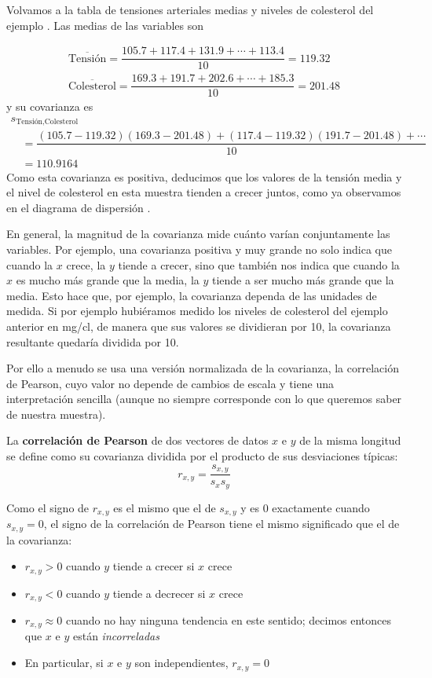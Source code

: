 \documentclass[
  spanish,
  letterpaper,
  DIV=11,
  numbers=noendperiod]{scrreprt}
\providecommand{\tightlist}{%
  \setlength{\itemsep}{0pt}\setlength{\parskip}{0pt}}
\begin{document}
\begin{tcolorbox}
Volvamos a la tabla de tensiones arteriales medias y niveles de
colesterol del ejemplo . Las medias de las variables son

\[
\begin{array}{l}
\overline{\text{Tensión}}=\dfrac{105.7+117.4+131.9+\cdots+113.4}{10}=119.32\\
\overline{\text{Colesterol}}=\dfrac{169.3+191.7+202.6+\cdots+185.3}{10}=201.48
\end{array}
\] y su covarianza es \[
\begin{array}{l}
s_{\text{Tensión},\text{Colesterol}}\\
\quad =\dfrac{(105.7-119.32)(169.3-201.48)+(117.4-119.32)(191.7-201.48)+\cdots}{10}\\
\quad=110.9164
\end{array}
\] Como esta covarianza es positiva, deducimos que los valores de la
tensión media y el nivel de colesterol en esta muestra tienden a crecer
juntos, como ya observamos en el diagrama de dispersión .

En general, la magnitud de la covarianza mide cuánto varían
conjuntamente las variables. Por ejemplo, una covarianza positiva y muy
grande no solo indica que cuando la \(x\) crece, la \(y\) tiende a
crecer, sino que también nos indica que cuando la \(x\) es mucho más
grande que la media, la \(y\) tiende a ser mucho más grande que la
media. Esto hace que, por ejemplo, la covarianza dependa de las unidades
de medida. Si por ejemplo hubiéramos medido los niveles de colesterol
del ejemplo anterior en mg/cl, de manera que sus valores se dividieran
por 10, la covarianza resultante quedaría dividida por 10.

Por ello a menudo se usa una versión normalizada de la covarianza, la
correlación de Pearson, cuyo valor no depende de cambios de escala y
tiene una interpretación sencilla (aunque no siempre corresponde con lo
que queremos saber de nuestra muestra).

La \textbf{correlación de Pearson} de dos vectores de datos \(x\) e
\(y\) de la misma longitud se define como su covarianza dividida por el
producto de sus desviaciones típicas: \[
r_{x,y}=\frac{s_{x,y}}{s_xs_y}
\]

Como el signo de \(r_{x,y}\) es el mismo que el de \(s_{x,y}\) y es 0
exactamente cuando \(s_{x,y}=0\), el signo de la correlación de Pearson
tiene el mismo significado que el de la covarianza:

\begin{itemize}
\tightlist
\item
  \(r_{x,y}>0\) cuando \(y\) tiende a crecer si \(x\) crece
\item
  \(r_{x,y}<0\) cuando \(y\) tiende a decrecer si \(x\) crece
\item
  \(r_{x,y}\approx 0\) cuando no hay ninguna tendencia en este sentido;
  decimos entonces que \(x\) e \(y\) están \emph{incorreladas}
\item
  En particular, si \(x\) e \(y\) son independientes, \(r_{x,y}=0\)
\end{itemize}


\end{tcolorbox}
\end{document}
